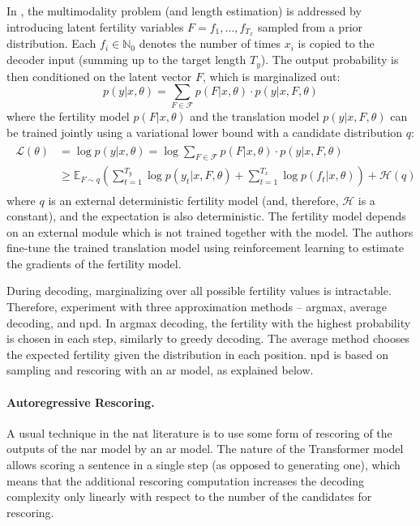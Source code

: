 In \citet{gu2017nonautoregressive}, the multimodality problem (and length
estimation) is addressed by introducing latent fertility variables
$F = f_1, \ldots, f_{T_x}$ sampled from a prior distribution. Each
$f_i \in \mathbb{N}_0$ denotes the number of times $x_i$ is copied to the
decoder input (summing up to the target length $T_y$). The output probability
is then conditioned on the latent vector $F$, which is marginalized out:
%
\begin{equation}
  p(y|x, \theta) = \sum_{F \in \mathcal{F}} p(F|x, \theta) \cdot p(y|x, F, \theta)
\end{equation}
%
where the fertility model $p(F|x, \theta)$ and the translation model
$p(y|x, F, \theta)$ can be trained jointly using a variational lower bound with
a candidate distribution $q$:
\begin{align}
  \begin{split}
    \mathcal{L}(\theta)
    & = \log p(y|x, \theta) = \log \sum_{F \in \mathcal{F}} p(F| x, \theta ) \cdot p(y | x, F, \theta) \\
    & \geq \mathbb{E}_{F \sim q} \left(\sum_{t=1}^{T_y} \log p(y_t | x, F,
      \theta) + \sum_{t=1}^{T_x} \log p(f_t | x, \theta) \right) +
    \mathcal{H}(q)
  \end{split}
\end{align}
%
where $q$ is an external deterministic fertility model (and, therefore,
$\mathcal{H}$ is a constant), and the expectation is also deterministic.  The
fertility model depends on an external module which is not trained together
with the model. The authors fine-tune the trained translation model using
reinforcement learning \citep{williams1992simple} to estimate the gradients of
the fertility model.

During decoding, marginalizing over all possible fertility values is
intractable. Therefore, \citet{gu2017nonautoregressive} experiment with three
approximation methods -- argmax, average decoding, and \ac{npd}. In argmax
decoding, the fertility with the highest probability is chosen in each step,
similarly to greedy decoding. The average method chooses the expected fertility
given the distribution in each position. \ac{npd} is based on sampling and
rescoring with an \acl{ar} model, as explained below.

\paragraph{Autoregressive Rescoring.} A usual technique in the \ac{nat}
literature is to use some form of rescoring of the outputs of the \acl{nar}
model by an \acl{ar} model. The nature of the Transformer model allows scoring
a sentence in a single step (as opposed to generating one), which means that
the additional rescoring computation increases the decoding complexity only
linearly with respect to the number of the candidates for rescoring.

